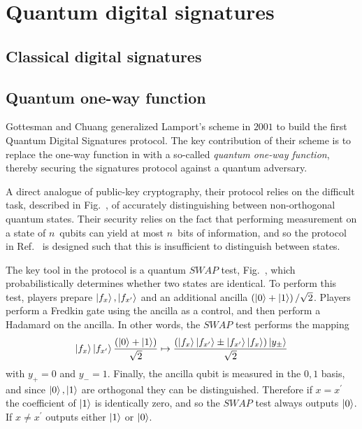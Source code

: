 \section{Quantum digital signatures}


\subsection*{Classical digital signatures}


\subsection*{Quantum one-way function}
Gottesman and Chuang \cite{Gottesman2001} generalized Lamport's scheme  in $2001$ to build the first Quantum Digital Signatures protocol. The key contribution of their scheme is to replace the one-way function in  with a so-called \emph{quantum one-way function}, thereby securing the signatures protocol against a quantum adversary.


A direct analogue of public-key cryptography, their protocol relies on the difficult task, described in Fig.~, of accurately distinguishing between non-orthogonal quantum states. Their security relies on the fact that performing measurement on a state of $n$~qubits can yield at most $n$~bits of information, and so the protocol in Ref.~\cite{Gottesman2001} is designed such that this is insufficient to distinguish between states.

The key tool in the protocol is a quantum $SWAP$ test, Fig.~, which probabilistically determines whether two states are identical. To perform this test, players prepare $\ket{f_x}, \ket{f_{x^\prime}}$ and an additional ancilla $\left(\ket{0} + \ket{1}\right)/\sqrt{2}$. Players perform a Fredkin gate  using the ancilla as a control, and then perform a Hadamard  on the ancilla. In other words, the $SWAP$ test performs the mapping
\begin{equation}
\ket{f_x}\ket{f_{x^\prime}}\frac{\left(\ket{0} + \ket{1}\right)}{\sqrt{2}} \mapsto \frac{\left(\ket{f_x}\ket{f_{x^\prime}} \pm \ket{f_{x^\prime}}\ket{f_x}\right)\ket{y_{\pm}}}{\sqrt{2}}
\end{equation}
with $y_+=0$ and $y_-=1$. Finally, the ancilla qubit is measured in the $0, 1$ basis, and since $\ket{0}, \ket{1}$ are orthogonal they can be distinguished.  Therefore if $x = x^\prime$ the coefficient of $\ket{1}$ is identically zero, and so the $SWAP$ test always outputs $\ket{0}$. If $x \ne x^\prime$ outputs either $\ket{1}$ or $\ket{0}$. 

